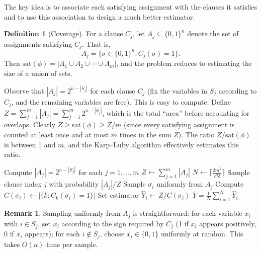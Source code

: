 \documentclass[twoside,12pt]{book}
\theoremstyle{plain}
\theoremstyle{definition}
\newtheorem{definition}[theorem]{Definition}
\newtheorem{remark}[theorem]{Remark}
\theoremstyle{remark}
\begin{document}
The key idea is to associate each satisfying assignment with the clauses it satisfies and to use this association to design a much better estimator.

\begin{definition}[Coverage]
For a clause $C_j$, let $A_j \subseteq \{0,1\}^n$ denote the set of assignments satisfying $C_j$. That is,
\[
A_j = \bigl\{ \sigma \in \{0,1\}^n : C_j(\sigma) = 1 \bigr\}.
\]
Then $\text{sat}(\phi) = |A_1 \cup A_2 \cup \cdots \cup A_m|$, and the problem reduces to estimating the size of a union of sets.
\end{definition}

Observe that $|A_j| = 2^{n - |S_j|}$ for each clause $C_j$ (fix the variables in $S_j$ according to $C_j$, and the remaining variables are free). This is easy to compute. Define $Z = \sum_{j=1}^m |A_j| = \sum_{j=1}^m 2^{n - |S_j|}$, which is the total ``area'' before accounting for overlaps. Clearly $Z \geq \text{sat}(\phi) \geq Z/m$ (since every satisfying assignment is counted at least once and at most $m$ times in the sum $Z$). The ratio $Z/\text{sat}(\phi)$ is between 1 and $m$, and the Karp--Luby algorithm effectively estimates this ratio.

\begin{algorithm}
\caption{Karp--Luby DNF Counting Algorithm}
\label{alg:karpluby}
\begin{algorithmic}[1]
    \State Compute $|A_j| = 2^{n - |S_j|}$ for each $j = 1, \ldots, m$
    \State $Z \gets \sum_{j=1}^m |A_j|$
    \State $N \gets \lceil \frac{2m^2}{\varepsilon^2\delta} \rceil$ 
        \State Sample clause index $j$ with probability $|A_j|/Z$
        \State Sample $\sigma_i$ uniformly from $A_j$ 
        \State Compute $C(\sigma_i) \gets |\{k : C_k(\sigma_i) = 1\}|$ 
    \State Set estimator $\hat{Y}_i \gets Z / C(\sigma_i)$
    \EndFor
    \State \Return $\bar{Y} = \frac{1}{N} \sum_{i=1}^N \hat{Y}_i$
\EndFunction
\end{algorithmic}
\end{algorithm}

\begin{remark}
Sampling uniformly from $A_j$ is straightforward: for each variable $x_i$ with $i \in S_j$, set $x_i$ according to the sign required by $C_j$ (1 if $x_i$ appears positively, 0 if $\overline{x}_i$ appears); for each $i \notin S_j$, choose $x_i \in \{0,1\}$ uniformly at random. This takes $O(n)$ time per sample.
\end{remark}
\end{document}
